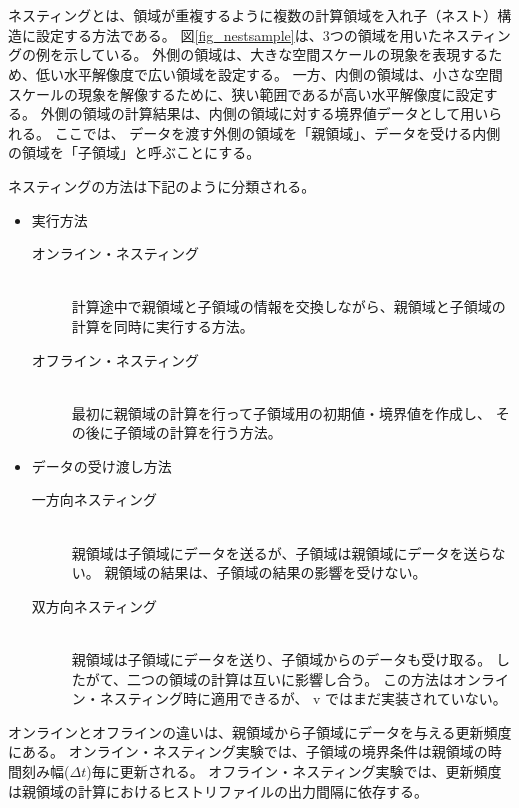 \section{\SecAdvanceNesting} \label{sec:nest_exp}

ネスティングとは、領域が重複するように複数の計算領域を入れ子（ネスト）構造に設定する方法である。
図\ref{fig_nestsample}は、3つの領域を用いたネスティングの例を示している。
外側の領域は、大きな空間スケールの現象を表現するため、低い水平解像度で広い領域を設定する。
一方、内側の領域は、小さな空間スケールの現象を解像するために、狭い範囲であるが高い水平解像度に設定する。
外側の領域の計算結果は、内側の領域に対する境界値データとして用いられる。
ここでは、
データを渡す外側の領域を「親領域」、データを受ける内側の領域を「子領域」と呼ぶことにする。

ネスティングの方法は下記のように分類される。
\begin{itemize}
\item 実行方法
\begin{description}
 \item[オンライン・ネスティング]\mbox{}\\
計算途中で親領域と子領域の情報を交換しながら、親領域と子領域の計算を同時に実行する方法。
 \item[オフライン・ネスティング]\mbox{}\\
最初に親領域の計算を行って子領域用の初期値・境界値を作成し、
その後に子領域の計算を行う方法。
\end{description}
\item データの受け渡し方法
\begin{description}
 \item[一方向ネスティング]\mbox{}\\
親領域は子領域にデータを送るが、子領域は親領域にデータを送らない。
親領域の結果は、子領域の結果の影響を受けない。
 \item[双方向ネスティング]\mbox{}\\
親領域は子領域にデータを送り、子領域からのデータも受け取る。
したがて、二つの領域の計算は互いに影響し合う。
この方法はオンライン・ネスティング時に適用できるが、
{\scalerm} v{\version} ではまだ実装されていない。
\end{description}
\end{itemize}

オンラインとオフラインの違いは、親領域から子領域にデータを与える更新頻度にある。
オンライン・ネスティング実験では、子領域の境界条件は親領域の時間刻み幅($\Delta t$)毎に更新される。
オフライン・ネスティング実験では、更新頻度は親領域の計算におけるヒストリファイルの出力間隔に依存する。


